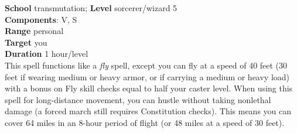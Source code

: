 \textbf{School} transmutation; \textbf{Level} sorcerer/wizard 5\\
\textbf{Components}: V, S\\
\textbf{Range} personal\\
\textbf{Target} you\\
\textbf{Duration} 1 hour/level\\
This spell functions like a \textit{fly }spell, except you can fly at a speed of 40 feet (30 feet if wearing medium or heavy armor, or if carrying a medium or heavy load) with a bonus on Fly skill checks equal to half your caster level. When using this spell for long-distance movement, you can hustle without taking nonlethal damage (a forced march still requires Constitution checks). This means you can cover 64 miles in an 8-hour period of flight (or 48 miles at a speed of 30 feet).\\
